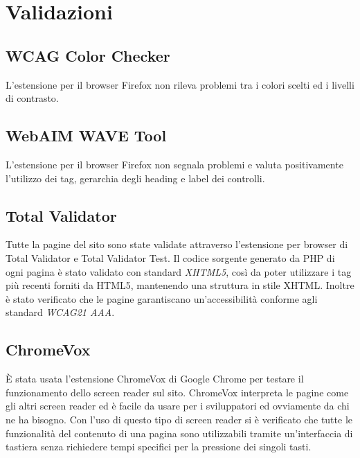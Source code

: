 \section{Validazioni}


\subsection{WCAG Color Checker}
L'estensione per il browser Firefox non rileva problemi tra i colori scelti ed i livelli di contrasto.

\subsection{WebAIM WAVE Tool}
L'estensione per il browser Firefox non segnala problemi e valuta positivamente l'utilizzo dei tag, gerarchia degli heading e label dei controlli.

\subsection{Total Validator}
Tutte la pagine del sito sono state validate attraverso l'estensione per browser di Total Validator e Total Validator Test. Il codice sorgente generato da PHP di ogni pagina è stato validato con standard \textit{XHTML5}, così da poter utilizzare i tag più recenti forniti da HTML5, mantenendo una struttura in stile XHTML. Inoltre è stato verificato che le pagine garantiscano un'accessibilità conforme agli standard \textit{WCAG21 AAA}.
\subsection{ChromeVox}
È stata usata l'estensione ChromeVox di Google Chrome per testare il funzionamento dello screen reader sul sito. ChromeVox interpreta le pagine come gli altri screen reader ed è facile da usare per i sviluppatori ed ovviamente da chi ne ha bisogno. Con l'uso di questo tipo di screen reader si è verificato che tutte le funzionalità del contenuto di una pagina sono utilizzabili tramite un'interfaccia di tastiera senza richiedere tempi specifici per la pressione dei singoli tasti.


\vfill
